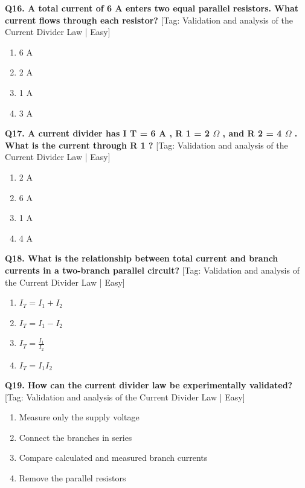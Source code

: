 \noindent\textbf{Q16. A total current of 6 A enters two equal parallel resistors. What current flows through each resistor?} \hfill [Tag: Validation and analysis of the Current Divider Law | Easy]
\begin{enumerate}[label=(\alph*),topsep=2pt,itemsep=1pt,partopsep=0pt,parsep=0pt]
    \item {6 A}
    \item {2 A}
    \item {1 A}
    \item {3 A}
\end{enumerate}
\vspace{2mm}

\noindent\textbf{Q17. A current divider has I T = 6 A , R 1 = 2 $\Omega$ , and R 2 = 4 $\Omega$ . What is the current through R 1 ?} \hfill [Tag: Validation and analysis of the Current Divider Law | Easy]
\begin{enumerate}[label=(\alph*),topsep=2pt,itemsep=1pt,partopsep=0pt,parsep=0pt]
    \item {2 A}
    \item {6 A}
    \item {1 A}
    \item {4 A}
\end{enumerate}
\vspace{2mm}

\noindent\textbf{Q18. What is the relationship between total current and branch currents in a two-branch parallel circuit?} \hfill [Tag: Validation and analysis of the Current Divider Law | Easy]
\begin{enumerate}[label=(\alph*),topsep=2pt,itemsep=1pt,partopsep=0pt,parsep=0pt]
    \item {$I_T = I_1 + I_2$}
    \item {$I_T = I_1 - I_2$}
    \item {$I_T = \frac{I_1}{I_2}$}
    \item {$I_T = I_1 I_2$}
\end{enumerate}
\vspace{2mm}

\noindent\textbf{Q19. How can the current divider law be experimentally validated?} \hfill [Tag: Validation and analysis of the Current Divider Law | Easy]
\begin{enumerate}[label=(\alph*),topsep=2pt,itemsep=1pt,partopsep=0pt,parsep=0pt]
    \item {Measure only the supply voltage}
    \item {Connect the branches in series}
    \item {Compare calculated and measured branch currents}
    \item {Remove the parallel resistors}
\end{enumerate}
\vspace{2mm}

